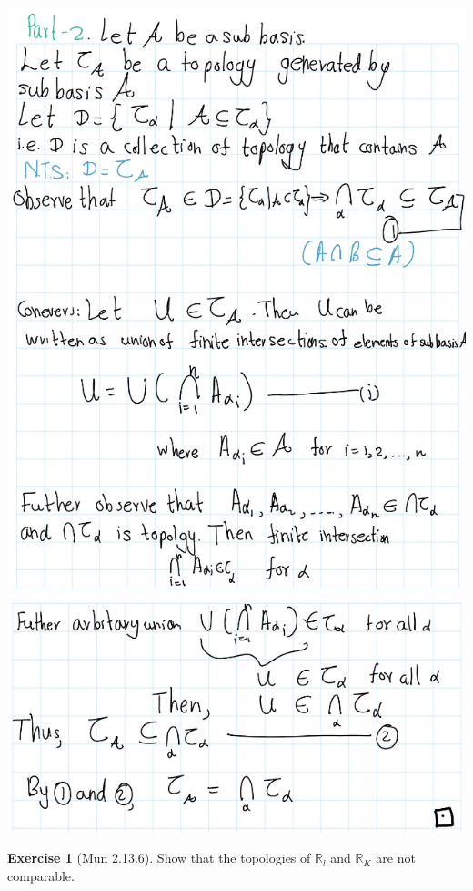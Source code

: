\documentclass[
]{book}
\theoremstyle{definition}
\theoremstyle{definition}
\theoremstyle{definition}
\newtheorem{exercise}{Exercise}[chapter]
\theoremstyle{definition}
\theoremstyle{remark}
\begin{document}
\includegraphics{figures/Exercises/Ex 2.13/ex-5-2.png}
\includegraphics{figures/Exercises/Ex 2.13/ex-5-3.png}

\begin{exercise}[Mun 2.13.6]
\protect\hypertarget{exr:unnamed-chunk-109}{}\label{exr:unnamed-chunk-109}Show that the topologies of \(\mathbb{R}_l\) and \(\mathbb{R}_K\) are not comparable.
\end{exercise}
\end{document}

